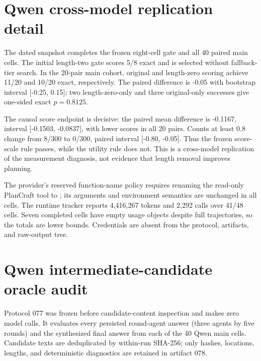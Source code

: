 \section{Qwen cross-model replication detail}

The dated \texttt{} snapshot completes the frozen eight-cell gate and all 40 paired main cells. The initial length-two gate scores 5/8 exact and is selected without fallback-tier search. In the 20-pair main cohort, original and length-zero scoring achieve 11/20 and 10/20 exact, respectively. The paired difference is -0.05 with bootstrap interval [-0.25, 0.15]; two length-zero-only and three original-only successes give one-sided exact \(p=0.8125\).

The causal score endpoint is decisive: the paired mean difference is -0.1167, interval [-0.1503, -0.0837], with lower scores in all 20 pairs. Counts at least 0.8 change from 8/300 to 0/300, paired interval [-0.80, -0.05]. Thus the frozen score-scale rule passes, while the utility rule does not. This is a cross-model replication of the measurement diagnosis, not evidence that length removal improves planning.

The provider's reserved function-name policy requires renaming the read-only PlanCraft \texttt{} tool to \texttt{}; its arguments and environment semantics are unchanged in all cells. The runtime tracker reports 4,416,267 tokens and 2,292 calls over 41/48 cells. Seven completed cells have empty usage objects despite full trajectories, so the totals are lower bounds. Credentials are absent from the protocol, artifacts, and raw-output tree.

\section{Qwen intermediate-candidate oracle audit}

Protocol 077 was frozen before candidate-content inspection and makes zero model calls. It evaluates every persisted round-agent answer (three agents by five rounds) and the synthesized final answer from each of the 40 Qwen main cells. Candidate texts are deduplicated by within-run SHA-256; only hashes, locations, lengths, and deterministic diagnostics are retained in artifact 078.

\begin{center}
\end{center}


